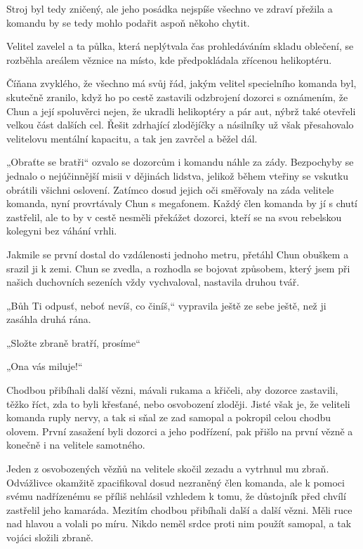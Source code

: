 Stroj byl tedy zničený, ale jeho posádka nejspíše všechno ve zdraví přežila a komandu by se tedy mohlo podařit aspoň někoho chytit. 

Velitel zavelel a ta půlka, která neplýtvala čas prohledáváním skladu oblečení, se rozběhla areálem věznice na místo, kde předpokládala zřícenou helikoptéru. 

Číňana zvyklého, že všechno má svůj řád, jakým velitel specielního komanda byl, skutečně zranilo, když ho po cestě zastavili odzbrojení dozorci s oznámením, že Chun a její spoluvěrci nejen, že ukradli helikoptéry a pár aut, nýbrž také otevřeli velkou část dalších cel. Řešit zdrhající zlodějíčky a násilníky už však přesahovalo velitelovu mentální kapacitu, a tak jen zavrčel a běžel dál.

„Obraťte se bratři“ ozvalo se dozorcům i komandu náhle za zády. Bezpochyby se jednalo o nejúčinnější misii v dějinách lidstva, jelikož během vteřiny se vskutku obrátili všichni oslovení. Zatímco dosud jejich oči směřovaly na záda velitele komanda, nyní provrtávaly Chun s megafonem. Každý člen komanda by jí s chutí zastřelil, ale to by v cestě nesměli překážet dozorci, kteří se na svou rebelskou kolegyni bez váhání vrhli.

Jakmile se první dostal do vzdálenosti jednoho metru, přetáhl Chun obuškem a srazil ji k zemi. Chun se zvedla, a rozhodla se bojovat způsobem, který jsem při našich duchovních sezeních vždy vychvaloval, nastavila druhou tvář. 

„Bůh Ti odpusť, neboť nevíš, co činíš,“ vypravila ještě ze sebe ještě, než ji zasáhla druhá rána.	

„Složte zbraně bratří, prosíme“

„Ona vás miluje!“

Chodbou přibíhali další vězni, mávali rukama a křičeli, aby dozorce zastavili, těžko říct, zda to byli křesťané, nebo osvobození zloději. Jisté však je, že veliteli komanda ruply nervy, a tak si sňal ze zad samopal a pokropil celou chodbu olovem. První zasažení byli dozorci a jeho podřízení, pak přišlo na první vězně a konečně i na velitele samotného.

Jeden z osvobozených vězňů na velitele skočil zezadu a vytrhnul mu zbraň. Odvážlivce okamžitě zpacifikoval dosud nezraněný člen komanda, ale k pomoci svému nadřízenému se příliš nehlásil vzhledem k tomu, že důstojník před chvílí zastřelil jeho kamaráda. Mezitím chodbou přibíhali další a další vězni. Měli ruce nad hlavou a volali po míru. Nikdo neměl srdce proti nim použít samopal, a tak vojáci složili zbraně.

